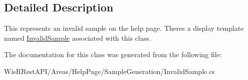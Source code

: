 \subsection{Detailed Description}
This represents an invalid sample on the help page. There\textquotesingle{}s a display template named \hyperlink{class_wis_r_rest_a_p_i_1_1_areas_1_1_help_page_1_1_invalid_sample}{Invalid\+Sample} associated with this class. 



The documentation for this class was generated from the following file\+:\begin{DoxyCompactItemize}
\item 
Wis\+R\+Rest\+A\+P\+I/\+Areas/\+Help\+Page/\+Sample\+Generation/Invalid\+Sample.\+cs\end{DoxyCompactItemize}
